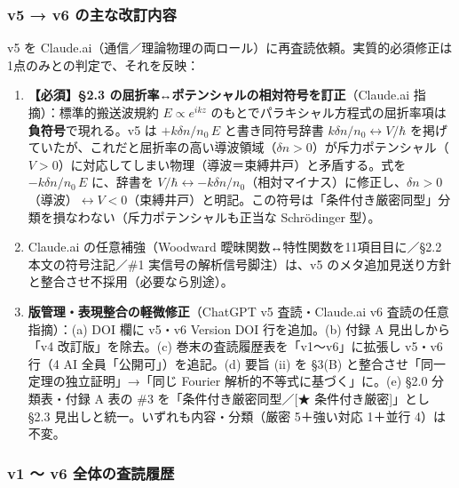 \documentclass[
]{ltjsarticle}
\providecommand{\tightlist}{%
  \setlength{\itemsep}{0pt}\setlength{\parskip}{0pt}}
\begin{document}
\subsubsection{v5 → v6
の主な改訂内容}\label{v5-v6-ux306eux4e3bux306aux6539ux8a02ux5185ux5bb9}

v5 を
Claude.ai（通信／理論物理の両ロール）に再査読依頼。実質的必須修正は1点のみとの判定で、それを反映：

\begin{enumerate}
\def\labelenumi{\arabic{enumi}.}
\tightlist
\item
  \textbf{【必須】§2.3 の屈折率↔ポテンシャルの相対符号を訂正}（Claude.ai
  指摘）：標準的搬送波規約 \(E\propto e^{ikz}\)
  のもとでパラキシャル方程式の屈折率項は\textbf{負符号}で現れる。v5 は
  \(+k\delta n/n_0\,E\) と書き同符号辞書
  \(k\delta n/n_0\leftrightarrow V/\hbar\)
  を掲げていたが、これだと屈折率の高い導波領域（\(\delta n>0\)）が斥力ポテンシャル（\(V>0\)）に対応してしまい物理（導波＝束縛井戸）と矛盾する。式を
  \(-k\delta n/n_0\,E\) に、辞書を
  \(V/\hbar\leftrightarrow -k\delta n/n_0\)（相対マイナス）に修正し、\(\delta n>0\)（導波）\(\leftrightarrow V<0\)（束縛井戸）と明記。この符号は「条件付き厳密同型」分類を損なわない（斥力ポテンシャルも正当な
  Schrödinger 型）。
\item
  Claude.ai の任意補強（Woodward 曖昧関数↔特性関数を11項目目に／§2.2
  本文の符号注記／\#1 実信号の解析信号脚注）は、v5
  のメタ追加見送り方針と整合させ不採用（必要なら別途）。
\item
  \textbf{版管理・表現整合の軽微修正}（ChatGPT v5 査読・Claude.ai v6
  査読の任意指摘）：(a) DOI 欄に v5・v6 Version DOI 行を追加。(b) 付録 A
  見出しから「v4 改訂版」を除去。(c)
  巻末の査読履歴表を「v1〜v6」に拡張し v5・v6 行（4 AI
  全員「公開可」）を追記。(d) 要旨 (ii) を §3(B)
  と整合させ「同一定理の独立証明」→「同じ Fourier
  解析的不等式に基づく」に。(e) §2.0 分類表・付録 A 表の \#3
  を「条件付き厳密同型／{[}★ 条件付き厳密{]}」とし §2.3
  見出しと統一。いずれも内容・分類（厳密 5＋強い対応 1＋並行 4）は不変。
\end{enumerate}

\subsubsection{v1 〜 v6
全体の査読履歴}\label{v1-v6-ux5168ux4f53ux306eux67fbux8aadux5c65ux6b74}
\end{document}
